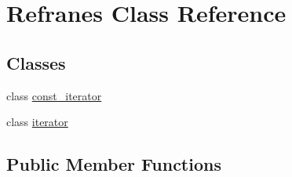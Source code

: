 \hypertarget{class_refranes}{}\section{Refranes Class Reference}
\label{class_refranes}
\subsection*{Classes}
\begin{DoxyCompactItemize}
\item 
class \hyperlink{class_refranes_1_1const__iterator}{const\+\_\+iterator}
\item 
class \hyperlink{class_refranes_1_1iterator}{iterator}
\end{DoxyCompactItemize}
\subsection*{Public Member Functions}
